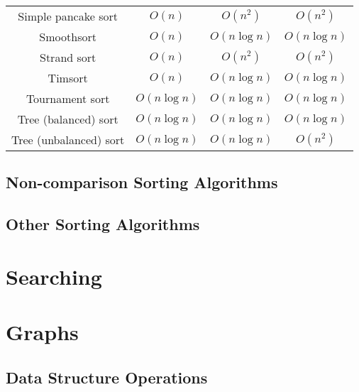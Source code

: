 \documentclass{article}
\begin{document}
\begin{table}[ht]
\begin{tabular}{cccc}
		Simple pancake sort & $O(n)$ & $O(n^2)$ & $O(n^2)$ \\
		Smoothsort & $O(n)$ & $O(n\log{n})$ & $O(n\log{n})$ \\
		Strand sort & $O(n)$ & $O(n^2)$ & $O(n^2)$ \\
		Timsort & $O(n)$ & $O(n\log{n})$ & $O(n\log{n})$ \\
		Tournament sort &$O(n\log{n})$ & $O(n\log{n})$ & $O(n\log{n})$ \\
		Tree (balanced) sort &$O(n\log{n})$ & $O(n\log{n})$ & $O(n\log{n})$ \\
		Tree (unbalanced) sort &$O(n\log{n})$ & $O(n\log{n})$ & $O(n^2)$ \\
		\hline
	\end{tabular}
\end{table}


\newpage
\subsection*{Non-comparison Sorting Algorithms}


\newpage
\subsection*{Other Sorting Algorithms}


\newpage
\section*{Searching}

\newpage
\section*{Graphs}
\subsection*{Data Structure Operations}
\end{document}

